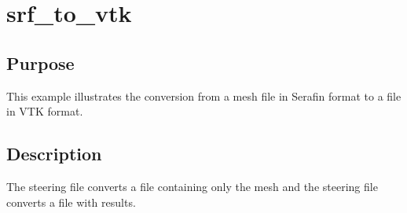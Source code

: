 \chapter{srf\_to\_vtk}
%
%
\section{Purpose}
This example illustrates the conversion from a mesh file in Serafin format to a
file in VTK format.
%
\section{Description}
The steering file  converts a file
containing only the mesh and the steering file
 converts a file with results.
%
%
%
%
%
%
%
%

%
